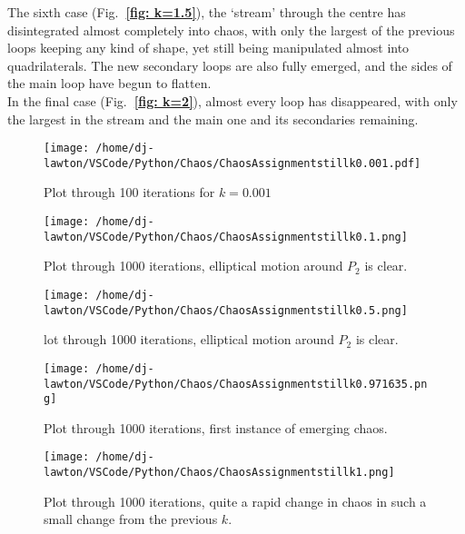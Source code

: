 \documentclass{article}
\begin{document}
\indent The sixth case (Fig.\textbf{~\ref{fig: k=1.5}}), the `stream' through the centre has disintegrated almost completely into chaos, with only the largest of the previous loops keeping any kind of shape, yet still being manipulated almost into quadrilaterals. The new secondary loops are also fully emerged, and the sides of the main loop have begun to flatten.\\
\indent In the final case (Fig.\textbf{~\ref{fig: k=2}}), almost every loop has disappeared, with only the largest in the stream and the main one and its secondaries remaining. 
\begin{figure}[H]
\begin{center}
\texttt{[image: /home/dj-lawton/VSCode/Python/Chaos/ChaosAssignmentstillk0.001.pdf]}
\caption{\label{fig: k=0.001still} Plot through 100 iterations for $k=0.001$}
\end{center}
\end{figure}

\begin{figure}[H]
\begin{center}
\texttt{[image: /home/dj-lawton/VSCode/Python/Chaos/ChaosAssignmentstillk0.1.png]}
\caption{\label{fig: k=0.1still}Plot through 1000 iterations, elliptical motion around $P_2$ is clear.}
\end{center}
\end{figure}

\begin{figure}[H]
\begin{center}
\texttt{[image: /home/dj-lawton/VSCode/Python/Chaos/ChaosAssignmentstillk0.5.png]}
\caption{\label{fig: k=0.5}lot through 1000 iterations, elliptical motion around $P_2$ is clear.}
\end{center}
\end{figure}

\begin{figure}[H]
\begin{center}
\texttt{[image: /home/dj-lawton/VSCode/Python/Chaos/ChaosAssignmentstillk0.971635.png]}
\caption{\label{fig: k=0.971635}Plot through 1000 iterations, first instance of emerging chaos.}
\end{center}
\end{figure}

\begin{figure}[H]
\begin{center}
\texttt{[image: /home/dj-lawton/VSCode/Python/Chaos/ChaosAssignmentstillk1.png]}
\caption{\label{fig: k=1}Plot through 1000 iterations, quite a rapid change in chaos in such a small change from the previous $k$.}
\end{center}
\end{figure}
\end{document}

